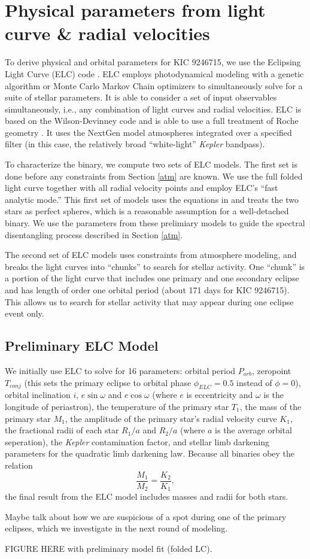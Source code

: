 \section{Physical parameters from light curve \& radial velocities}\label{model}
To derive physical and orbital parameters for KIC 9246715, we use the Eclipsing Light Curve (ELC) code \citep{oro00}. ELC employs photodynamical modeling with a genetic algorithm or Monte Carlo Markov Chain optimizers to simultaneously solve for a suite of stellar parameters. It is able to consider a set of input observables simultaneously, i.e., any combination of light curves and radial velocities. ELC is based on the Wilson-Devinney code \citep{wil71} and is able to use a full treatment of Roche geometry \citep{avn75}. It uses the NextGen model atmospheres integrated over a specified filter (in this case, the relatively broad ``white-light'' \emph{Kepler} bandpass).

To characterize the binary, we compute two sets of ELC models. The first set is done before any constraints from Section \ref{atm} are known. We use the full folded light curve together with all radial velocity points and employ ELC's ``fast analytic mode.'' This first set of models uses the equations in \citet{gim06} and treats the two stars as perfect spheres, which is a reasonable assumption for a well-detached binary. We use the parameters from these prelimiary models to guide the spectral disentangling process described in Section \ref{atm}.

The second set of ELC models uses constraints from atmosphere modeling, and breaks the light curves into ``chunks'' to search for stellar activity. One ``chunk'' is a portion of the light curve that includes one primary and one secondary eclipse and has length of order one orbital period (about 171 days for KIC 9246715). This allows us to search for stellar activity that may appear during one eclipse event only. %

\subsection{Preliminary ELC Model}

We initially use ELC to solve for 16 parameters: orbital period $P_{orb}$, zeropoint $T_{conj}$ (this sets the primary eclipse to orbital phase $\phi_{ELC} = 0.5$ instead of $\phi = 0$), orbital inclination $i$, $e \sin \omega$ and $e \cos \omega$ (where $e$ is eccentricity and $\omega$ is the longitude of periastron), the temperature of the primary star $T_1$, the mass of the primary star $M_1$, the amplitude of the primary star's radial velocity curve $K_1$, the fractional radii of each star $R_1/a$ and $R_2/a$ (where $a$ is the average orbital seperation), the \emph{Kepler} contamination factor, and stellar limb darkening parameters for the quadratic limb darkening law. Because all binaries obey the relation
\begin{equation}
\frac{M_1}{M_2} = \frac{K_2}{K_1},
\end{equation}
the final result from the ELC model includes masses and radii for both stars.

Maybe talk about how we are suspicious of a spot during one of the primary eclipses, which we investigate in the next round of modeling.

FIGURE HERE with preliminary model fit (folded LC).
